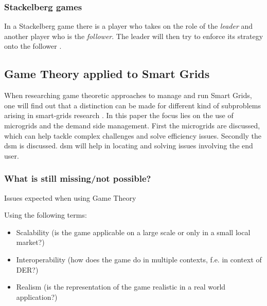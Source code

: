 \subsubsection{Stackelberg games}
In a Stackelberg game there is a player who takes on the role of the \textit{leader} and another player who is the \textit{follower}. The leader will then try to enforce its strategy onto the follower \cite{ShohamLeyton-Brown2008}.

\subsection{Game Theory applied to Smart Grids}
When researching game theoretic approaches to manage and run Smart Grids, one will find out that a distinction can be made for different kind of subproblems arising in smart-grids research \cite{keypaper}. In this paper the focus lies on the use of microgrids and the demand side management. First the microgrids are discussed, which can help tackle complex challenges and solve efficiency issues. Secondly the \gls{dsm} is discussed. \gls{dsm} will help in locating and solving issues involving the end user. 


\subsubsection{What is still missing/not possible?}

Issues expected when using Game Theory

Using the following terms:
\begin{itemize}
	\item Scalability (is the game applicable on a large scale or only in a small local market?)
	\item Interoperability (how does the game do in multiple contexts, f.e. in context of DER?)
	\item Realism (is the representation of the game realistic in a real world application?)
\end{itemize}